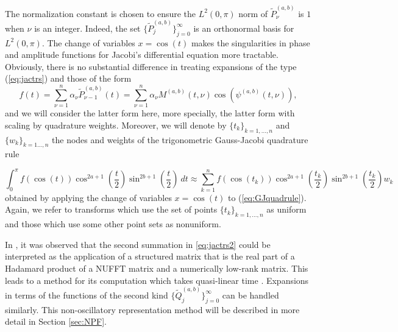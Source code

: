 \documentclass[11pt]{article}
\begin{document}
The normalization constant is chosen to ensure the $L^{2}(0,\pi)$ norm of $\tilde{P}_{\nu}^{(a,b)}$ is $1$ when $\nu$ is an integer. Indeed, the set $\{\tilde{P}_{j}^{(a,b)}\}_{j=0}^{\infty}$ 
 is an orthonormal basis for $L^{2}(0,\pi)$. The change of variables $x = \cos(t)$ makes the singularities in phase and amplitude functions for Jacobi's differential equation more tractable. 
Obviously, there is no substantial difference in treating expansions of the type (\ref{eq:jactrs})
 and those of the form
\begin{equation}
\label{eq:jactrs2}
f(t) = \sum\limits_{\nu=1}^{n}\alpha_{\nu}\tilde{P}_{\nu-1}^{(a,b)}(t)=\sum\limits_{\nu=1}^{n}\alpha_{\nu}M^{(a,b)}(t,\nu)\cos (\psi^{(a,b)}(t,\nu)),
\end{equation} 
and we will consider the latter form here, more specially, the latter form with scaling by quadrature weights.  Moreover, we will denote by $\{t_k\}_{k=1,\ldots,n}$ and 
$\{w_k\}_{k=1\ldots, n}$ the nodes and weights of the trigonometric Gauss-Jacobi quadrature rule

\begin{equation}
\int_{0}^\pi f(\cos(t)) \cos^{2a+1}\left(\frac{t}{2}\right)   \sin^{2b+1}\left(\frac{t}{2}\right)\ dt 
\approx
\sum_{k=1}^n f(\cos(t_k)) 
\cos^{2a+1}\left(\frac{t_k}{2}\right)   \sin^{2b+1}\left(\frac{t_k}{2}\right)
w_k
\label{introduction:modrule}
\end{equation}
obtained by applying the change of variables $x=\cos(t)$ to (\ref{eq:GJquadrule}).
Again, we refer to transforms which use the set of points $\{t_k\}_{k=1,\ldots,n}$ as uniform
and those which use some other point sets as nonuniform.






In \cite{Jacobi}, it was observed that the second summation in
\eqref{eq:jactrs2} could be interpreted as the application of a 
 structured matrix that is the real part of a Hadamard product of a NUFFT matrix and a numerically low-rank matrix.  This leads to a method for
its computation which takes quasi-linear time 
\cite{Townsend,Candes-Demanet-Ying,yang2018unified}. Expansions in terms of the functions of the second
kind  $\{\tilde{Q}_{j}^{(a,b)}\}_{j=0}^{\infty}$ can be handled similarly. This non-oscillatory representation method will be described in more detail in
Section \ref{sec:NPF}.  
\end{document}
